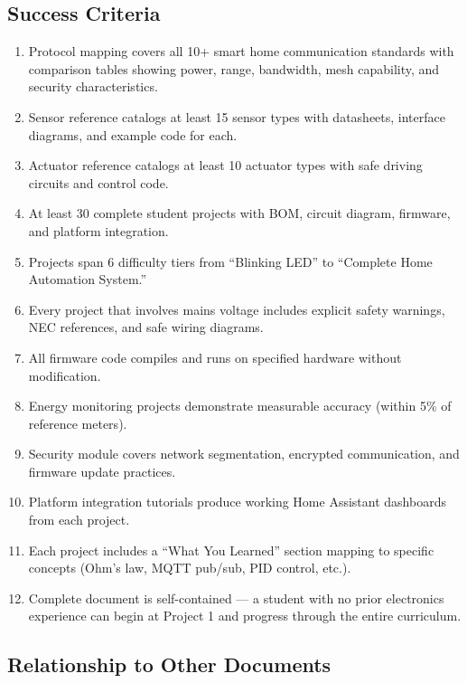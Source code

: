 \documentclass[11pt,letterpaper]{article}
\begin{document}
\subsection{Success Criteria}

\begin{enumerate}
  \item Protocol mapping covers all 10+ smart home communication standards with comparison tables showing power, range, bandwidth, mesh capability, and security characteristics.
  \item Sensor reference catalogs at least 15 sensor types with datasheets, interface diagrams, and example code for each.
  \item Actuator reference catalogs at least 10 actuator types with safe driving circuits and control code.
  \item At least 30 complete student projects with BOM, circuit diagram, firmware, and platform integration.
  \item Projects span 6 difficulty tiers from ``Blinking LED'' to ``Complete Home Automation System.''
  \item Every project that involves mains voltage includes explicit safety warnings, NEC references, and safe wiring diagrams.
  \item All firmware code compiles and runs on specified hardware without modification.
  \item Energy monitoring projects demonstrate measurable accuracy (within 5\% of reference meters).
  \item Security module covers network segmentation, encrypted communication, and firmware update practices.
  \item Platform integration tutorials produce working Home Assistant dashboards from each project.
  \item Each project includes a ``What You Learned'' section mapping to specific concepts (Ohm's law, MQTT pub/sub, PID control, etc.).
  \item Complete document is self-contained --- a student with no prior electronics experience can begin at Project 1 and progress through the entire curriculum.
\end{enumerate}

\subsection{Relationship to Other Documents}
\end{document}
